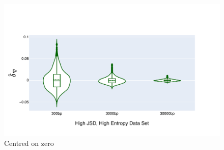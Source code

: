 \begin{figure}[!ht]
\centering
\includegraphics[width=\textwidth]{figures/plots/synthetic/d-conv/High JSD, High Entropy.pdf}
\caption{Centred on zero}
\label{fig:synthetic/d-conv/HighJSDHighEntropy}
\end{figure}